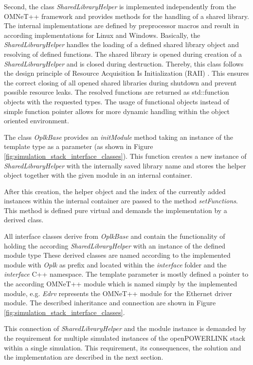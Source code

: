 \begin{sloppypar}
Second, the class \emph{SharedLibraryHelper} is implemented independently from the OMNeT++ framework and provides methods for the handling of a shared library.
The internal implementations are defined by preprocessor macros and result in according implementations for Linux and Windows.
Basically, the \emph{SharedLibraryHelper} handles the loading of a defined shared library object and resolving of defined functions.
The shared library is opened during creation of a \emph{SharedLibraryHelper} and is closed during destruction.
Thereby, this class follows the design principle of Resource Acquisition Is Initialization (RAII) \cite{cpp_raii}.
This ensures the correct closing of all opened shared libraries during shutdown and prevent possible resource leaks.
The resolved functions are returned as std::function objects with the requested types.
The usage of functional objects instead of simple function pointer allows for more dynamic handling within the object oriented environment.
\end{sloppypar}

The class \emph{OplkBase} provides an \emph{initModule} method taking an instance of the template type as a parameter (as shown in Figure \ref{fig:simulation_stack_interface_classes}).
This function creates a new instance of \emph{SharedLibraryHelper} with the internally saved library name and stores the helper object together with the given module in an internal container.

After this creation, the helper object and the index of the currently added instances within the internal container are passed to the method \emph{setFunctions}.
This method is defined pure virtual and demands the implementation by a derived class.

All interface classes derive from \emph{OplkBase} and contain the functionality of holding the according \emph{SharedLibraryHelper} with an instance of the defined module type
These derived classes are named according to the implemented module with \emph{Oplk} as prefix and located within the \emph{interface} folder and the \emph{interface} C++ namespace.
The template parameter is mostly defined a pointer to the according OMNeT++ module which is named simply by the implemented module, e.g. \emph{Edrv} represents the OMNeT++ module for the Ethernet driver module.
The described inheritance and connection are shown in Figure \ref{fig:simulation_stack_interface_classes}.

\begin{sloppypar}
This connection of \emph{SharedLibraryHelper} and the module instance is demanded by the requirement for multiple simulated instances of the openPOWERLINK stack within a single simulation.
This requirement, its consequences, the solution and the implementation are described in the next section.
\end{sloppypar}

